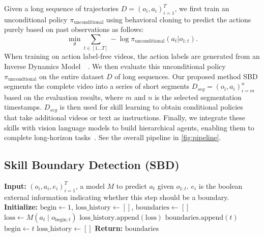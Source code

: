 Given a long sequence of trajectories $D = {(o_i, a_i)}_{i=1}^T$, we first train an unconditional policy $\pi_{\text{unconditional}}$ using behavioral cloning to predict the actions purely based on past observations as follows:
\begin{equation}
    \min_{\theta} \sum_{t \in [1 \dots T]} -\log \pi_{\text{unconditional}} (a_t | o_{1:t}).
\end{equation}
When training on action label-free videos, the action labels are generated from an Inverse Dynamics Model~\citep{vpt}~.
We then evaluate this unconditional policy $\pi_\text{uncondtional}$ on the entire dataset $D$ of long sequences. Our proposed method SBD segments the complete video into a series of short segments $D_{seg} = {(o_i,a_i)}_{i=m}^{n}$ based on the evaluation results, where $m$ and $n$ is the selected segmentation timestamps. $D_{seg}$ is then used for skill learning to obtain conditional policies~\citep{groot1,steve1} that take additional videos or text as instructions. 
Finally, we integrate these skills with vision language models to build hierarchical agents, enabling them to complete long-horizon tasks~\citep{omnijarvis,jarvis-1}. See the overall pipeline in \cref{fig:pipeline}.

\subsection{Skill Boundary Detection (SBD)}\label{sec:sbd_1}

\begin{algorithm}[t]
\caption{Skill Boundary Detection}\label{alg:SBD}
\begin{algorithmic}[1]
\STATE \textbf{Input:} \((o_i, a_i, e_i)_{i=1}^T\), a model \(M\) to predict \(a_t\) given \(o_{1:t}\). \(e_i\) is the boolean external information indicating whether this step should be a boundary.
\STATE \textbf{Initialize:} $\text{begin} \gets 1$, $\text{loss\_history} \gets []$, $\text{boundaries} \gets []$
    \STATE $\text{loss} \gets M(a_t \mid o_{\text{begin}:t})$
    \STATE $\text{loss\_history.append}(\text{loss})$
        \STATE $\text{boundaries.append}(t)$
        \STATE $\text{begin} \gets t$
        \STATE $\text{loss\_history} \gets []$
    \ENDIF
\ENDFOR
\STATE \textbf{Return:} $\text{boundaries}$
\end{algorithmic}
\end{algorithm}

